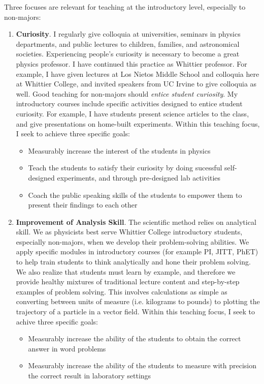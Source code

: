 \documentclass[../../main.tex]{subfiles}
\begin{document}
Three focuses are relevant for teaching at the introductory level, especially to non-majors:
\begin{enumerate}
\item \textbf{Curiosity}.  I regularly give colloquia at universities, seminars in physics departments, and public lectures to children, families, and astronomical societies.  Experiencing people's curiosity is necessary to become a great physics professor.  I have continued this practice as Whittier professor.  For example, I have given lectures at Los Nietos Middle School and colloquia here at Whittier College, and invited speakers from UC Irvine to give colloquia as well.  Good teaching for non-majors should \textit{entice student curiosity}.  My introductory courses include specific activities designed to entice student curiosity.  For example, I have students present science articles to the class, and give presentations on home-built experiments.  Within this teaching focus, I seek to achieve three specific goals:

\begin{itemize}
\item Measurably increase the interest of the students in physics %
\item Teach the students to satisfy their curiosity by doing sucessful self-designed experiments, and through pre-designed lab activities %
\item Coach the public speaking skills of the students to empower them to present their findings to each other %
\end{itemize}

\item \textbf{Improvement of Analysis Skill}.  The scientific method relies on analytical skill.  We as physicists best serve Whittier College introductory students, especially non-majors, when we develop their problem-solving abilities.  We apply specific modules in introductory courses (for example PI, JITT, PhET) to help train students to think analytically and hone their problem solving.  We also realize that students must learn by example, and therefore we provide healthy mixtures of traditional lecture content and step-by-step examples of problem solving.  This involves calculations as simple as converting between units of measure (i.e. kilograms to pounds) to plotting the trajectory of a particle in a vector field.  Within this teaching focus, I seek to achive three specific goals:

\begin{itemize}
\item Measurably increase the ability of the students to obtain the correct answer in word problems %
\item Measurably increase the ability of the students to measure with precision the correct result in laboratory settings 
\end{itemize}


\end{enumerate}
\end{document}

